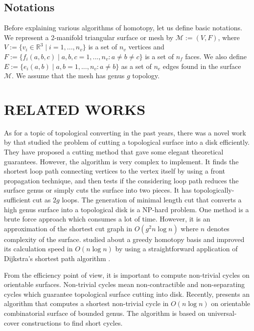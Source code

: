 \documentclass[a4paper,twoside]{article}
\begin{document}
\subsection*{Notations}
Before explaining various algorithms of homotopy, let us define basic notations. We represent a 2-manifold triangular surface or mesh by $\mathscr{M}:=(V,F)$, where $V:=\{ v_{i}\in \mathbb{R}^3 \mid i = 1, ... , n_v\}$ is a set of $n_v$ vertices and $F:=\{ f_{i}(a,b,c) \mid a,b,c = 1, ... , n_v : a \neq b \neq c\}$ is a set of $n_f$ faces. We also define $E:=\{ e_{i}(a,b) \mid a,b = 1, ... , n_v : a \neq b\}$ as a set of $n_e$ edges found in the surface $\mathscr{M}$. We assume that the mesh has genus $g$ topology. 


\section{\uppercase{Related Works}}
\label{sec:related works}
\noindent As for a topic of topological converting in the past years, there was a novel work  by \cite{Erickson:2002:OCS:513400.513430} that studied the problem of cutting a topological surface into a disk efficiently. They have proposed a cutting method that gave some elegant theoretical guarantees. However, the algorithm is very complex to implement. It finds the shortest loop path connecting vertices to the vertex itself by using a front propagation technique, and then tests if the considering loop path reduces the surface genus or simply cuts the surface into two pieces. It has topologically-sufficient cut as $2g$ loops. The generation of minimal length cut that converts a high genus surface into a topological disk is a NP-hard problem. One method is a brute force approach which consumes a lot of time. However, it is an approximation of the shortest cut graph in $O(g^2 n \log n)$ where $n$ denotes complexity of the surface. \cite{Erickson:2005:GOH:1070432.1070581} studied about a greedy homotopy basis and improved its calculation speed in $O(n \log n)$
by using a straightforward application of Dijkstra's shortest path algorithm \cite{Dijkstra59anote}. 

From the efficiency point of view, it is important to compute non-trivial cycles on orientable surfaces. Non-trivial cycles mean non-contractible and non-separating cycles which guarantee topological surface cutting into disk. Recently, \cite{Kutz:2006:CSN:1137856.1137919} presents an algorithm that computes a shortest non-trivial cycle in $O(n \log n)$ on orientable combinatorial surface of bounded genus. The algorithm is based on universal-cover constructions to find short cycles.
\end{document}
